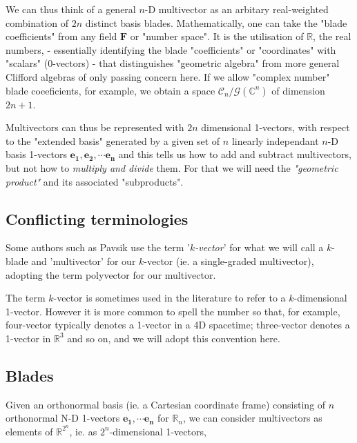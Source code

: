 \documentclass[a4paper]{book}
\numberwithin{equation}{chapter}
\begin{document}
We can thus think of a general $n$-D multivector as an arbitary real-weighted combination of $2n$ distinct basis blades. Mathematically, one can take the "blade coefficients" from any 
field $\mathbf{F}$ or "number space". It is the utilisation of $\mathbb{R}$, the real numbers,
- essentially identifying the blade "coefficients" or "coordinates" with "scalars" (0-vectors)
- that distinguishes "geometric algebra" from more general Clifford algebras of only passing 
concern here. If we allow "complex number" blade coeeficients, for example,  we obtain a space 
$\mathcal{C}_n/\mathcal{G}(\mathbb{C}^n)$ of dimension $2n+1$.
    
    \vspace{\baselineskip}
    
 Multivectors can thus be represented with $2n$ dimensional 1-vectors, with respect to the 
 "extended basis" generated by a given set of $n$ linearly independant $n$-D basis 1-vectors 
 $\mathbf{e_1, e_2, \cdots e_n}$ and this tells us how to add and subtract multivectors, but 
 not how to \emph{multiply and divide} them. For that we will need the \emph{"geometric product"} and its associated "subproducts". 

    \subsection{Conflicting terminologies}

 Some authors such as Pavsik use the term '\emph{$k$-vector}' for what we will call a $k$-blade
 and 'multivector' for our $k$-vector (ie. a single-graded multivector), adopting the term 
 polyvector for our multivector.

\vspace{\baselineskip}
 
 The term $k$-vector is sometimes used in the literature to refer to a $k$-dimensional 1-vector. 
 However it is more common to spell the number so that, for example, four-vector typically denotes
 a 1-vector in a 4D spacetime; three-vector denotes a 1-vector in $\mathbb{R}^3$ and so on, and we
 will adopt this convention here.   

    \subsection{Blades}

Given an orthonormal basis (ie. a Cartesian coordinate frame) consisting of $n$
orthonormal N-D 1-vectors $\mathbf{e_1,\cdots e_n}$ for $\mathbb{R}_{n}$,
we can consider multivectors as elements of $\mathbb{R}^{2^n}$, 
ie. as $2^n$-dimensional 1-vectors,
\end{document}
